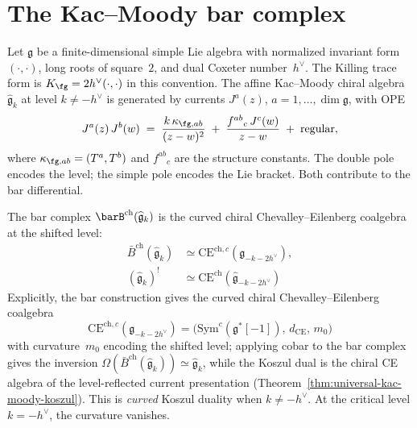 \section{The Kac--Moody bar complex}%
\label{sec:km-bar-complex}

Let $\mathfrak{g}$ be a finite-dimensional simple Lie algebra with
normalized invariant form $(\cdot,\cdot)$, long roots of square~$2$,
and dual Coxeter number~$h^\vee$. The Killing trace form is
$K_{\fg}=2h^\vee(\cdot,\cdot)$ in this convention.
The affine Kac--Moody chiral algebra $\widehat{\mathfrak{g}}_k$
at level $k \neq -h^\vee$ is generated by currents
$J^a(z)$, $a = 1, \ldots, \dim \mathfrak{g}$, with OPE
\[
 J^a(z)\,J^b(w) \;=\; \frac{k\,\kappa_{\fg,ab}}{(z-w)^2}
 \;+\; \frac{f^{ab}{}_c \, J^c(w)}{z-w}
 \;+\; \text{regular},
\]
where $\kappa_{\fg,ab}=(T^a,T^b)$ and $f^{ab}{}_c$ are the structure
constants. The double pole encodes the level; the simple pole encodes
the Lie bracket. Both contribute to the bar differential.

The bar complex $\barB^{\mathrm{ch}}(\widehat{\mathfrak{g}}_k)$ is
the curved chiral Chevalley--Eilenberg coalgebra at the shifted level:
\begin{align}\label{eq:kac-moody-koszul-basic}
\bar{B}^{\mathrm{ch}}(\widehat{\mathfrak{g}}_k) &\simeq \mathrm{CE}^{\mathrm{ch},c}(\mathfrak{g}_{-k-2h^\vee}), \nonumber\\
(\widehat{\mathfrak{g}}_k)^! &\simeq
\mathrm{CE}^{\mathrm{ch}}(\widehat{\mathfrak{g}}_{-k-2h^\vee})
\end{align}
Explicitly, the bar construction gives the curved chiral
Chevalley--Eilenberg coalgebra
\[
\mathrm{CE}^{\mathrm{ch},c}(\mathfrak{g}_{-k-2h^\vee})
= \bigl(\mathrm{Sym}^c(\mathfrak{g}^*[-1]),\, d_{\mathrm{CE}},\, m_0\bigr)
\]
with curvature~$m_0$ encoding the shifted level; applying cobar
to the bar complex gives the inversion
$\Omega(\bar{B}^{\mathrm{ch}}(\widehat{\mathfrak{g}}_k))
\simeq \widehat{\mathfrak{g}}_k$, while the Koszul dual is the
chiral CE algebra of the level-reflected current presentation
(Theorem~\ref{thm:universal-kac-moody-koszul}).
This is \emph{curved} Koszul duality when $k \neq -h^\vee$.
At the critical level $k = -h^\vee$, the curvature vanishes.

